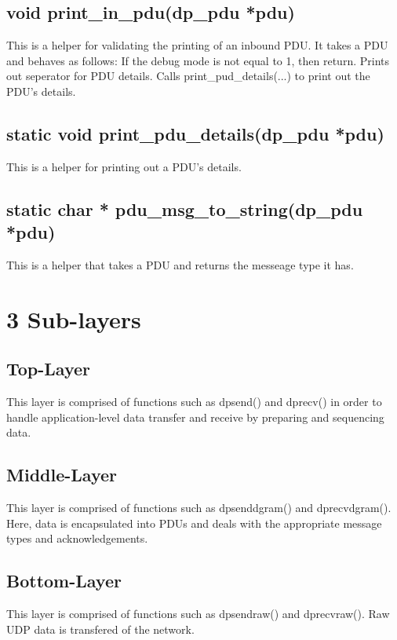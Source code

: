 \documentclass[12pt, a4paper]{article}
\begin{document}
{\subsection{void print\_in\_pdu(dp\_pdu *pdu)}
This is a helper for validating the printing of an inbound PDU. It takes a PDU and behaves as follows: \newline
\indent If the debug mode is not equal to 1, then return. \newline
\indent Prints out seperator for PDU details. \newline
\indent Calls print\_pud\_details(...) to print out the PDU's details.

\subsection{static void print\_pdu\_details(dp\_pdu *pdu)}
This is a helper for printing out a PDU's details.

\subsection{static char * pdu\_msg\_to\_string(dp\_pdu *pdu)}
This is a helper that takes a PDU and returns the messeage type it has.

\newpage
\section{3 Sub-layers}

\subsection{Top-Layer}
This layer is comprised of functions such as dpsend() and dprecv() in order to handle
application-level data transfer and receive by preparing and sequencing data.

\subsection{Middle-Layer}
This layer is comprised of functions such as dpsenddgram() and dprecvdgram(). Here, data
is encapsulated into PDUs and deals with the appropriate message types and acknowledgements.

\subsection{Bottom-Layer}
This layer is comprised of functions such as dpsendraw() and dprecvraw(). Raw UDP data is
transfered of the network.

}
\end{document}
